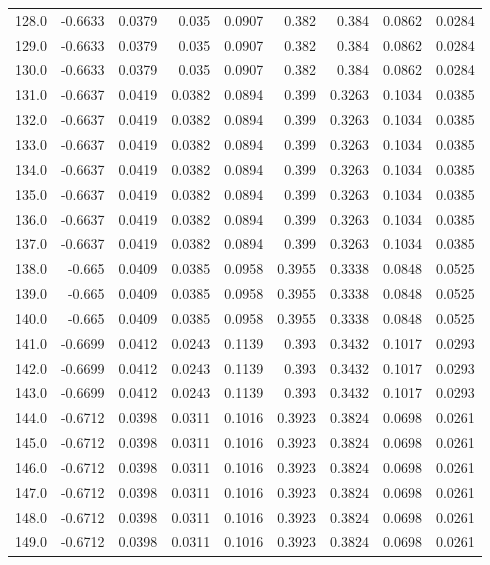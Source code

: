 \begin{longtable}{lrrrrrrrr}
128.0 & -0.6633 & 0.0379 & 0.035 & 0.0907 & 0.382 & 0.384 & 0.0862 & 0.0284 \\
129.0 & -0.6633 & 0.0379 & 0.035 & 0.0907 & 0.382 & 0.384 & 0.0862 & 0.0284 \\
130.0 & -0.6633 & 0.0379 & 0.035 & 0.0907 & 0.382 & 0.384 & 0.0862 & 0.0284 \\
131.0 & -0.6637 & 0.0419 & 0.0382 & 0.0894 & 0.399 & 0.3263 & 0.1034 & 0.0385 \\
132.0 & -0.6637 & 0.0419 & 0.0382 & 0.0894 & 0.399 & 0.3263 & 0.1034 & 0.0385 \\
133.0 & -0.6637 & 0.0419 & 0.0382 & 0.0894 & 0.399 & 0.3263 & 0.1034 & 0.0385 \\
134.0 & -0.6637 & 0.0419 & 0.0382 & 0.0894 & 0.399 & 0.3263 & 0.1034 & 0.0385 \\
135.0 & -0.6637 & 0.0419 & 0.0382 & 0.0894 & 0.399 & 0.3263 & 0.1034 & 0.0385 \\
136.0 & -0.6637 & 0.0419 & 0.0382 & 0.0894 & 0.399 & 0.3263 & 0.1034 & 0.0385 \\
137.0 & -0.6637 & 0.0419 & 0.0382 & 0.0894 & 0.399 & 0.3263 & 0.1034 & 0.0385 \\
138.0 & -0.665 & 0.0409 & 0.0385 & 0.0958 & 0.3955 & 0.3338 & 0.0848 & 0.0525 \\
139.0 & -0.665 & 0.0409 & 0.0385 & 0.0958 & 0.3955 & 0.3338 & 0.0848 & 0.0525 \\
140.0 & -0.665 & 0.0409 & 0.0385 & 0.0958 & 0.3955 & 0.3338 & 0.0848 & 0.0525 \\
141.0 & -0.6699 & 0.0412 & 0.0243 & 0.1139 & 0.393 & 0.3432 & 0.1017 & 0.0293 \\
142.0 & -0.6699 & 0.0412 & 0.0243 & 0.1139 & 0.393 & 0.3432 & 0.1017 & 0.0293 \\
143.0 & -0.6699 & 0.0412 & 0.0243 & 0.1139 & 0.393 & 0.3432 & 0.1017 & 0.0293 \\
144.0 & -0.6712 & 0.0398 & 0.0311 & 0.1016 & 0.3923 & 0.3824 & 0.0698 & 0.0261 \\
145.0 & -0.6712 & 0.0398 & 0.0311 & 0.1016 & 0.3923 & 0.3824 & 0.0698 & 0.0261 \\
146.0 & -0.6712 & 0.0398 & 0.0311 & 0.1016 & 0.3923 & 0.3824 & 0.0698 & 0.0261 \\
147.0 & -0.6712 & 0.0398 & 0.0311 & 0.1016 & 0.3923 & 0.3824 & 0.0698 & 0.0261 \\
148.0 & -0.6712 & 0.0398 & 0.0311 & 0.1016 & 0.3923 & 0.3824 & 0.0698 & 0.0261 \\
149.0 & -0.6712 & 0.0398 & 0.0311 & 0.1016 & 0.3923 & 0.3824 & 0.0698 & 0.0261 \\

\end{longtable}
